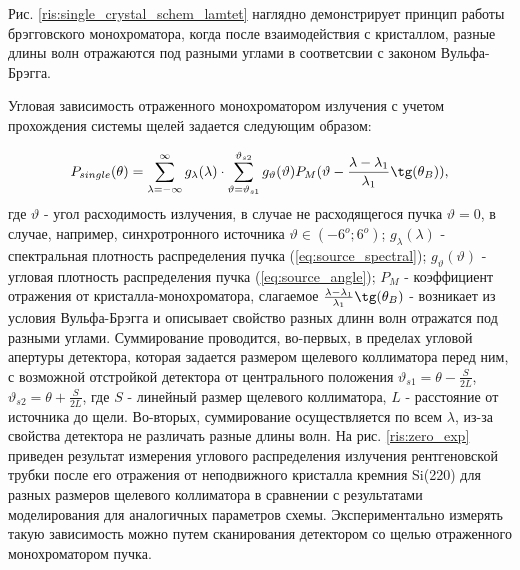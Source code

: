 Рис. \ref{ris:single_crystal_schem_lamtet} наглядно демонстрирует принцип работы
брэгговского монохроматора, когда после взаимодействия с кристаллом, разные
длины волн отражаются под разными углами в соответсвии с законом Вульфа-Брэгга.

Угловая зависимость отраженного монохроматором излучения с учетом прохождения
системы щелей задается следующим образом:

\begin{equation} \label{eq:p_single_crystal}
  P_{single}(\theta) = \sum_{\lambda = -\infty}^{\infty}g_{\lambda}(\lambda) \cdot \sum_{\vartheta = \vartheta_{s1}}^{\vartheta_{s2}}
  g_{\vartheta}(\vartheta) P_M(\vartheta - \frac{\lambda - \lambda_1}{\lambda_1}\tg(\theta_B)),
 \end{equation}
\noindent
где $\vartheta$ - угол расходимость излучения, в случае не расходящегося пучка $\vartheta = 0$, в
случае, например, синхротронного источника $\vartheta \in (-6^o; 6^o) $; $g_{\lambda}(\lambda)$
- спектральная плотность распределения пучка (\ref{eq:source_spectral}); $g_{\vartheta}(\vartheta)$ - угловая плотность
распределения пучка (\ref{eq:source_angle}); $P_M$ - коэффициент отражения от кристалла-монохроматора,
слагаемое $\frac{\lambda - \lambda_1}{\lambda_1}\tg(\theta_B)$ - возникает из
условия Вульфа-Брэгга и описывает свойство разных длинн волн отражатся под разными углами.
 Суммирование проводится, во-первых, в пределах угловой апертуры детектора, которая задается размером
 щелевого коллиматора перед ним, с возможной отстройкой детектора от центрального положения
  $\vartheta_{s1} = \theta - \frac{S}{2L}$, $\vartheta_{s2} = \theta + \frac{S}{2L}$, где
   $S $ - линейный размер щелевого коллиматора, $L$ - расстояние от источника до щели.
 Во-вторых, суммирование осуществляется по всем $\lambda$, из-за свойства детектора не различать разные длины волн.
На рис. \ref{ris:zero_exp} приведен результат измерения углового распределения излучения рентгеновской трубки
после его отражения от неподвижного кристалла кремния Si(220) для разных размеров щелевого коллиматора
в сравнении с результатами моделирования для аналогичных параметров схемы.
Экспериментально измерять такую зависимость можно путем сканирования
детектором со щелью отраженного монохроматором пучка.
